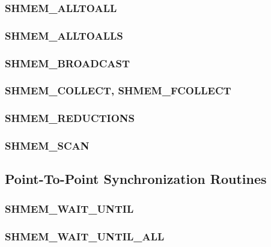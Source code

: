\documentclass[10pt,oneside]{book}
\begin{document}
\subsubsection{\textbf{SHMEM\_ALLTOALL}}\label{subsec:shmem_alltoall}


\subsubsection{\textbf{SHMEM\_ALLTOALLS}}\label{subsec:shmem_alltoalls}


\subsubsection{\textbf{SHMEM\_BROADCAST}}\label{subsec:shmem_broadcast}


\subsubsection{\textbf{SHMEM\_COLLECT, SHMEM\_FCOLLECT}}\label{subsec:shmem_collect}


\subsubsection{\textbf{SHMEM\_REDUCTIONS}}\label{subsec:shmem_reductions}


\subsubsection{\textbf{SHMEM\_SCAN}}\label{subsec:shmem_scan}





\subsection{Point-To-Point Synchronization Routines}\label{subsec:p2p_intro}


\subsubsection{\textbf{SHMEM\_WAIT\_UNTIL}}\label{subsec:shmem_wait_until}


\subsubsection{\textbf{SHMEM\_WAIT\_UNTIL\_ALL}}\label{subsec:shmem_wait_until_all}

\end{document}
